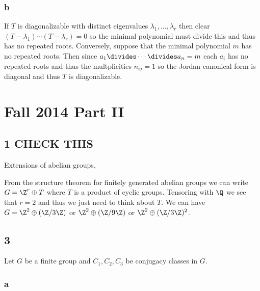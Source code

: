 \documentclass[12pt]{article}
\begin{document}
\subsubsection{b}

If $T$ is diagonalizable with distinct eigenvalues $\lambda_1, \dots, \lambda_r$ then clear $(T - \lambda_1) \cdots (T - \lambda_r) = 0$ so the minimal polynomial must divide this and thus has no repeated roots. Conversely, suppose that the minimal polynomial $m$ has no repeated roots. Then since $a_1 \divides \cdots \divides a_n = m$ each $a_i$ has no repeated roots and thus the multplicities $n_{ij} = 1$ so the Jordan canonical form is diagonal and thus $T$ is diagonalizable.


\section{Fall 2014 Part II}

\subsection{1 CHECK THIS}

Extensions of abelian groups,
\begin{center}
\end{center}
From the structure theorem for finitely generated abelian groups we can write $G = \Z^r \oplus T$ where $T$ is a product of cyclic groups. Tensoring with $\Q$ we see that $r = 2$ and thus we just need to think about $T$. We can have $G = \Z^2 \oplus (\Z / 3 \Z)$ or $\Z^2 \oplus (\Z / 9 \Z)$ or $\Z^2 \oplus (\Z / 3 \Z)^2$.

\subsection{3}

Let $G$ be a finite group and $C_1, C_2, C_3$ be conjugacy classes in $G$.

\subsubsection{a}
\end{document}
